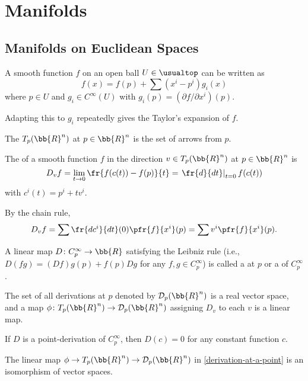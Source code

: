 \section{Manifolds\cite{loring}}
\subsection{Manifolds on Euclidean Spaces}
A smooth function $f$ on an open ball $U \in \usualtop$ can be written as
\[
f(x) = f(p) + \sum (x^i - p^i) g_i(x)
\]
where $p \in U$ and $g_i \in C^\infty (U)$ with $g_i(p) = (\partial f / \partial x^i)(p)$.

Adapting this to $g_i$ repeatedly gives the Taylor's expansion of $f$.

The  $T_p (\bb{R}^n)$ at $p \in \bb{R}^n$ is the set of arrows from $p$.

The  of a smooth function $f$ in the direction $v \in T_p(\bb{R}^n)$ at $p \in \bb{R}^n$ is
\[
D_v f = \lim_{t \to 0} \fr{f(c(t)) - f(p)}{t} = \left. \fr{d}{dt}\right|_{t=0} f(c(t))
\]
with $c^i(t) = p^i + tv^i$.

By the chain rule,
\[
D_v f = \sum \fr{dc^i}{dt}(0)\pfr{f}{x^i}(p) = \sum v^i \pfr{f}{x^i}(p).
\]

A linear map $D \colon C_p^\infty \to \bb{R}$ satisfying the Leibniz rule (i.e., $D(fg) = (D f)g(p) + f(p)D g$ for any $f, g \in C_p^\infty$) is called a  at $p$ or a  of $C_p^\infty$.

The set of all derivations at $p$ denoted by $\mathcal{D}_p(\bb{R}^n)$ is a real vector space, and a map $\phi \colon T_p(\bb{R}^n) \to \mathcal{D}_p(\bb{R}^n)$ assigning $D_v$ to each $v$ is a linear map.

If $D$ is a point-derivation of $C_p^\infty$, then $D(c) = 0$ for any constant function $c$.

The linear map $\phi \to T_p(\bb{R}^n) \to \mathcal{D}_p(\bb{R}^n)$ in \ref{derivation-at-a-point} is an isomorphism of vector spaces.

